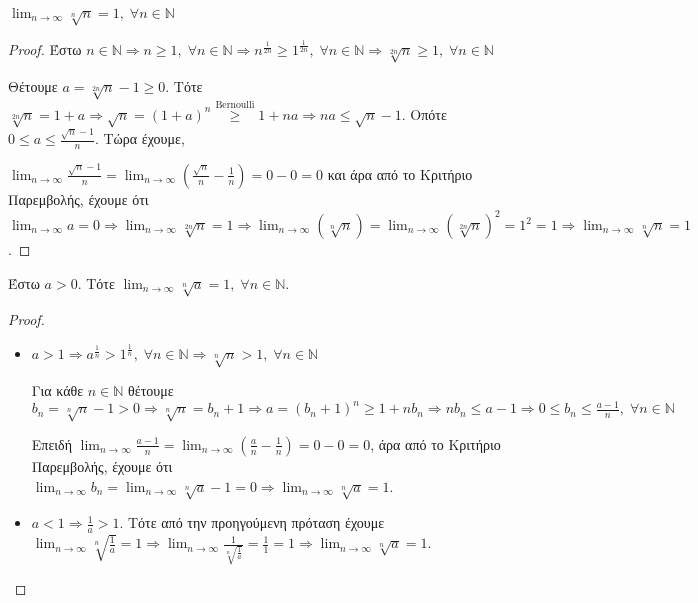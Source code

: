 \documentclass[main.tex]{subfiles}
\begin{document}
\begin{prop}
    $ \lim_{n \to \infty} \sqrt[n]{n} = 1, \; \forall n \in \mathbb{N}  $
\end{prop}

\begin{proof}
    Έστω $ n \in \mathbb{N} \Rightarrow n \geq 1, \; \forall n \in 
    \mathbb{N} \Rightarrow n ^{\frac{1}{2n}} \geq 1^{\frac{1}{2n}}, \; 
    \forall n \in \mathbb{N} \Rightarrow \sqrt[2n]{n} \geq 1, \; \forall n 
    \in \mathbb{N} $

    Θέτουμε $ a = \sqrt[2n]{n} -1 \geq 0 $. Τότε $ \sqrt[2n]{n} = 1 + a 
    \Rightarrow \sqrt{n} = (1+a)^{n} \overset{\text{Bernoulli}}{\geq} 1 
    + na \Rightarrow na \leq \sqrt{n} - 1  $. Οπότε $ 0 \leq a \leq
    \frac{\sqrt{n} -1}{n} $. Τώρα έχουμε, 

    $ \lim_{n \to \infty} \frac{\sqrt{n} -1}{n} = \lim_{n \to \infty} 
    \left( \frac{\sqrt{n}}{n} - \frac{1}{n}\right) = 0 - 0 = 0 $ και 
    άρα από το Κριτήριο Παρεμβολής, έχουμε ότι $ \lim_{n \to \infty} a = 0 
    \Rightarrow \lim_{n \to \infty} \sqrt[2n]{n} = 1 \Rightarrow \lim_{n \to
    \infty} (\sqrt[n]{n}) = \lim_{n \to \infty} (\sqrt[2n]{n})^{2} =  
    1^{2} = 1 \Rightarrow \lim_{n \to \infty} \sqrt[n]{n} =1 $.
\end{proof}

\begin{prop}
    Έστω $ a>0 $. Τότε $ \lim_{n \to \infty} \sqrt[n]{a}=1, \; \forall n \in
    \mathbb{N} $.
\end{prop}

\begin{proof}
\item {}
    \begin{itemize}
        \item $ a>1 \Rightarrow a^{\frac{1}{n}} > 1^{\frac{1}{n}}, \; 
            \forall n \in \mathbb{N} \Rightarrow \sqrt[n]{n} >1, \; 
            \forall n \in \mathbb{N} $

            Για κάθε $ n \in \mathbb{N} $ θέτουμε $ b_{n} = \sqrt[n]{n} -1 
            > 0 \Rightarrow \sqrt[n]{n} = b_{n} + 1 \Rightarrow a = (
            b_{n}+1)^{n} \geq 1 + n b_{n} \Rightarrow n b_{n} \leq a-1
            \Rightarrow 0 \leq b_{n} \leq \frac{a-1}{n}, \; \forall n \in
            \mathbb{N} $

            Επειδή $ \lim_{n \to \infty} \frac{a-1}{n} = \lim_{n \to \infty}
            (\frac{a}{n} - \frac{1}{n}) = 0 - 0 = 0 $, άρα από το 
            Κριτήριο Παρεμβολής, έχουμε ότι $ \lim_{n \to \infty} b_{n} = 
            \lim_{n \to \infty} \sqrt[n]{a}-1 = 0 \Rightarrow \lim_{n \to
            \infty} \sqrt[n]{a} =1 $.

        \item $ a< 1 \Rightarrow \frac{1}{a} > 1 $. Τότε από την 
            προηγούμενη πρόταση έχουμε 
            $ \lim_{n \to \infty} \sqrt[n]{\frac{1}{a} } = 1 \Rightarrow 
            \lim_{n \to \infty} \frac{1}{\sqrt[n]{\frac{1}{a}}} = 
            \frac{1}{1} = 1 \Rightarrow \lim_{n \to \infty} \sqrt[n]{a} 
            = 1$.
    \end{itemize}
\end{proof}
\end{document}

